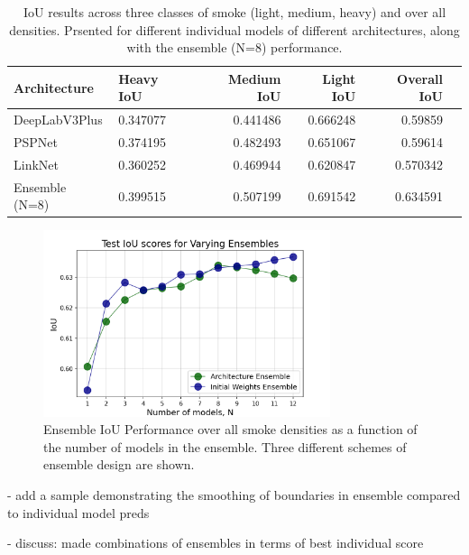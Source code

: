 \documentclass{article}
\begin{document}
\begin{table}[h]
    \centering
    \begin{tabular}{llrrr>{\bfseries}r}
        \hline
         Architecture   &   Heavy IoU &   Medium IoU &   Light IoU &   Overall IoU \\
        \hline
         DeepLabV3Plus  &   0.347077 &     0.441486 &  0.666248 &      0.59859  \\
         PSPNet         &   0.374195 &     0.482493 &  0.651067 &      0.59614  \\
         LinkNet        &   0.360252 &     0.469944 &  0.620847 &      0.570342 \\
         \rowcolor{yellow} Ensemble (N=8) &   0.399515 &     0.507199 &  0.691542 &      0.634591 \\
        \hline
    \end{tabular}
    \caption{IoU results across three classes of smoke (light, medium, heavy) and over all densities. Prsented for different individual models  of different architectures, along with the ensemble (N=8) performance.}
    \label{tab:results}
    \end{table}


\begin{figure}[h]
    \centering
    \includegraphics[width=0.75\textwidth]{ensemble_size_plot.png}
    \caption{Ensemble IoU Performance over all smoke densities as a function of the number of models in the ensemble. Three different schemes of ensemble design are shown. }
    \label{fig:ensemble_size_plot}
\end{figure}

- add a sample demonstrating the smoothing of boundaries in ensemble compared to individual model preds

- discuss: made combinations of ensembles in terms of best individual score 
\end{document}
